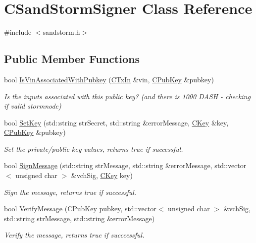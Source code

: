 \hypertarget{class_c_sand_storm_signer}{}\section{C\+Sand\+Storm\+Signer Class Reference}
\label{class_c_sand_storm_signer}


{\ttfamily \#include $<$sandstorm.\+h$>$}

\subsection*{Public Member Functions}
\begin{DoxyCompactItemize}
\item 
bool \hyperlink{class_c_sand_storm_signer_a21af58bfa950441f5d61e789a876ddda}{Is\+Vin\+Associated\+With\+Pubkey} (\hyperlink{class_c_tx_in}{C\+Tx\+In} \&vin, \hyperlink{class_c_pub_key}{C\+Pub\+Key} \&pubkey)
\begin{DoxyCompactList}\small\item\em Is the inputs associated with this public key? (and there is 1000 D\+A\+S\+H -\/ checking if valid stormnode) \end{DoxyCompactList}\item 
bool \hyperlink{class_c_sand_storm_signer_ac9823b3f497f6e9f1e3d426f662af92b}{Set\+Key} (std\+::string str\+Secret, std\+::string \&error\+Message, \hyperlink{class_c_key}{C\+Key} \&key, \hyperlink{class_c_pub_key}{C\+Pub\+Key} \&pubkey)
\begin{DoxyCompactList}\small\item\em Set the private/public key values, returns true if successful. \end{DoxyCompactList}\item 
bool \hyperlink{class_c_sand_storm_signer_a5c9a3f21a823f17e2831247573931698}{Sign\+Message} (std\+::string str\+Message, std\+::string \&error\+Message, std\+::vector$<$ unsigned char $>$ \&vch\+Sig, \hyperlink{class_c_key}{C\+Key} key)
\begin{DoxyCompactList}\small\item\em Sign the message, returns true if successful. \end{DoxyCompactList}\item 
bool \hyperlink{class_c_sand_storm_signer_a8d2fb7c16fcfb1be633101dd5436d3ae}{Verify\+Message} (\hyperlink{class_c_pub_key}{C\+Pub\+Key} pubkey, std\+::vector$<$ unsigned char $>$ \&vch\+Sig, std\+::string str\+Message, std\+::string \&error\+Message)
\begin{DoxyCompactList}\small\item\em Verify the message, returns true if succcessful. \end{DoxyCompactList}\end{DoxyCompactItemize}


